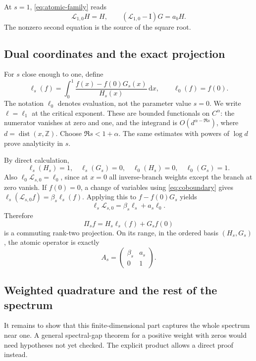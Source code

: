 \documentclass[11pt,a4paper]{article}
\numberwithin{equation}{section}
\theoremstyle{definition}
\theoremstyle{remark}
\newcommand{\ZZ}{\mathbb Z}
\newcommand{\dd}{\,\mathrm d}
\newcommand{\Lop}{\mathcal L}
\newcommand{\Id}{\mathrm I}
\newcommand{\Proj}{\Pi}
\newcommand{\dist}{\operatorname{dist}}
\begin{document}
At $s=1$, \cref{eq:atomic-family} reads
\begin{equation}
 \Lop_{1,0}H=H,\qquad (\Lop_{1,0}-\Id)G=a_bH.
 \label{eq:jordan-chain}
\end{equation}
The nonzero second equation is the source of the square root.

\subsection{Dual coordinates and the exact projection}
For $s$ close enough to one, define
\begin{equation}
 \ell_s(f)=\int_0^1\frac{f(x)-f(0)G_s(x)}{H_s(x)}\dd x,
 \qquad \ell_0(f)=f(0).
 \label{eq:ell-s}
\end{equation}
The notation $\ell_0$ denotes evaluation, not the parameter value $s=0$.
We write $\ell=\ell_1$ at the critical exponent.
These are bounded functionals on $C^\alpha$: the numerator vanishes at
zero and one, and the integrand is $O(d^{\alpha-\Re s})$, where
$d=\dist(x,\ZZ)$. Choose $\Re s<1+\alpha$.
The same estimates with powers of $\log d$ prove analyticity in $s$.

By direct calculation,
\begin{equation}
 \ell_s(H_s)=1,\quad \ell_s(G_s)=0,\quad
 \ell_0(H_s)=0,\quad \ell_0(G_s)=1.
 \label{eq:dual-basis}
\end{equation}
Also $\ell_0\Lop_{s,0}=\ell_0$, since at $x=0$ all inverse-branch
weights except the branch at zero vanish. If $f(0)=0$, a change of
variables using \cref{eq:coboundary} gives
$\ell_s(\Lop_{s,0}f)=\beta_s\ell_s(f)$. Applying this to
$f-f(0)G_s$ yields
\begin{equation}
 \ell_s\Lop_{s,0}=\beta_s\ell_s+a_s\ell_0.
 \label{eq:dual-invariance}
\end{equation}
Therefore
\begin{equation}
 \Proj_sf=H_s\ell_s(f)+G_sf(0)
 \label{eq:projection}
\end{equation}
is a commuting rank-two projection. On its range, in the ordered basis
$(H_s,G_s)$, the atomic operator is exactly
\begin{equation}
 A_s=\begin{pmatrix}\beta_s&a_s\\0&1\end{pmatrix}.
 \label{eq:atomic-matrix}
\end{equation}

\subsection{Weighted quadrature and the rest of the spectrum}
It remains to show that this finite-dimensional part captures the whole
spectrum near one. A general spectral-gap theorem for a positive weight
with zeros would need hypotheses not yet checked. The explicit product
allows a direct proof instead.
\end{document}
